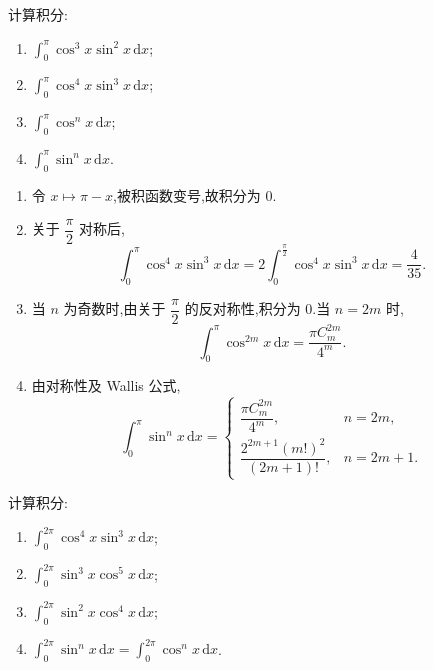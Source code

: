 \begin{example}
    计算积分:
    \begin{enumerate}
        \item $\displaystyle\int_0^\pi\cos^3x\sin^2x\,\mathrm{d}x$;
        \item $\displaystyle\int_0^\pi\cos^4x\sin^3x\,\mathrm{d}x$;
        \item $\displaystyle\int_0^\pi\cos^n x\,\mathrm{d}x$;
        \item $\displaystyle\int_0^\pi\sin^n x\,\mathrm{d}x$.
    \end{enumerate}
\end{example}
\exampleblank

\begin{solution}
    \leavevmode
    \begin{enumerate}
        \item 令 $x\mapsto\pi-x$,被积函数变号,故积分为 $0$.
        \item 关于 $\dfrac{\pi}{2}$ 对称后,
              \[
                  \displaystyle\int_0^\pi\cos^4x\sin^3x\,\mathrm{d}x
                  =2\int_0^{\frac{\pi}{2}}\cos^4x\sin^3x\,\mathrm{d}x
                  =\boxed{\dfrac{4}{35}}.
              \]
        \item 当 $n$ 为奇数时,由关于 $\dfrac{\pi}{2}$ 的反对称性,积分为 $0$.当 $n=2m$ 时,
              \[
                  \displaystyle\int_0^\pi\cos^{2m}x\,\mathrm{d}x
                  =\boxed{\dfrac{\pi C_m^{2m}}{4^m}}.
              \]
        \item 由对称性及 Wallis 公式,
              \[
                  \displaystyle\int_0^\pi\sin^n x\,\mathrm{d}x
                  =
                  \begin{cases}
                      \dfrac{\pi C_m^{2m}}{4^m},       & n=2m,   \\[6pt]
                      \dfrac{2^{2m+1}(m!)^2}{(2m+1)!}, & n=2m+1.
                  \end{cases}
              \]
    \end{enumerate}
\end{solution}

\begin{example}
    计算积分:
    \begin{enumerate}
        \item $\displaystyle\int_0^{2\pi}\cos^4x\sin^3x\,\mathrm{d}x$;
        \item $\displaystyle\int_0^{2\pi}\sin^3x\cos^5x\,\mathrm{d}x$;
        \item $\displaystyle\int_0^{2\pi}\sin^2x\cos^4x\,\mathrm{d}x$;
        \item $\displaystyle\int_0^{2\pi}\sin^n x\,\mathrm{d}x
                  =\int_0^{2\pi}\cos^n x\,\mathrm{d}x$.
    \end{enumerate}
\end{example}
\exampleblank

